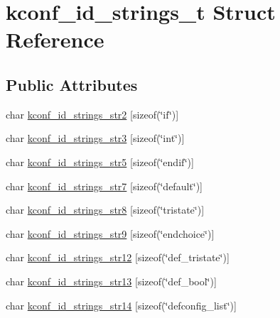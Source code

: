 \hypertarget{structkconf__id__strings__t}{\section{kconf\-\_\-id\-\_\-strings\-\_\-t Struct Reference}
\label{structkconf__id__strings__t}
}
\subsection*{Public Attributes}
\begin{DoxyCompactItemize}
\item 
char \hyperlink{structkconf__id__strings__t_acc6efd6c4fff4f95f6e7ed827a2c47e1}{kconf\-\_\-id\-\_\-strings\-\_\-str2} \mbox{[}sizeof(\char`\"{}if\char`\"{})\mbox{]}
\item 
char \hyperlink{structkconf__id__strings__t_a5bd7b2989b3e9138f61e8df6b5851705}{kconf\-\_\-id\-\_\-strings\-\_\-str3} \mbox{[}sizeof(\char`\"{}int\char`\"{})\mbox{]}
\item 
char \hyperlink{structkconf__id__strings__t_a7e76644b8a8ab2d240e9e5bbe1dac130}{kconf\-\_\-id\-\_\-strings\-\_\-str5} \mbox{[}sizeof(\char`\"{}endif\char`\"{})\mbox{]}
\item 
char \hyperlink{structkconf__id__strings__t_af3ee236c35d939a0a2582493912c75be}{kconf\-\_\-id\-\_\-strings\-\_\-str7} \mbox{[}sizeof(\char`\"{}default\char`\"{})\mbox{]}
\item 
char \hyperlink{structkconf__id__strings__t_abd5c859d5ff9fa87a44f11ba6e0d6c3f}{kconf\-\_\-id\-\_\-strings\-\_\-str8} \mbox{[}sizeof(\char`\"{}tristate\char`\"{})\mbox{]}
\item 
char \hyperlink{structkconf__id__strings__t_a601871c251c4ab09f2daccde3fcbb6e6}{kconf\-\_\-id\-\_\-strings\-\_\-str9} \mbox{[}sizeof(\char`\"{}endchoice\char`\"{})\mbox{]}
\item 
char \hyperlink{structkconf__id__strings__t_aebb5fad4eeb3e2b2c8283a4c6bf74e93}{kconf\-\_\-id\-\_\-strings\-\_\-str12} \mbox{[}sizeof(\char`\"{}def\-\_\-tristate\char`\"{})\mbox{]}
\item 
char \hyperlink{structkconf__id__strings__t_a265e81050faa77657481407ab37b1d66}{kconf\-\_\-id\-\_\-strings\-\_\-str13} \mbox{[}sizeof(\char`\"{}def\-\_\-bool\char`\"{})\mbox{]}
\item 
char \hyperlink{structkconf__id__strings__t_ab366901ba295dcb57c7626f2e2ed7d45}{kconf\-\_\-id\-\_\-strings\-\_\-str14} \mbox{[}sizeof(\char`\"{}defconfig\-\_\-list\char`\"{})\mbox{]}

\end{DoxyCompactItemize}
